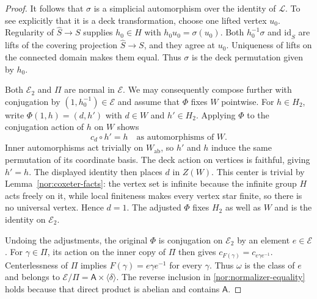 \begin{proof}
It follows that $\sigma$ is a simplicial automorphism over
the identity of $\mathcal L$.  To see explicitly that it is
a deck transformation, choose one lifted vertex $u_0$.
Regularity of $\widehat S\to S$ supplies $h_0\in H$ with
$h_0u_0=\sigma(u_0)$.  Both $h_0^{-1}\sigma$ and
$\mathrm{id}_{\widehat S}$ are lifts of the covering
projection $\widehat S\to S$, and they agree at $u_0$.
Uniqueness of lifts on the connected domain makes them equal.
Thus $\sigma$ is the deck permutation given by $h_0$.

Both $\mathcal E_2$ and $\Pi$ are normal in $\mathcal E$.
We may consequently compose further with conjugation by
$(1,h_0^{-1})\in\mathcal E$ and assume that $\Phi$ fixes
$W$ pointwise.  For $h\in H_2$, write
$\Phi(1,h)=(d,h')$ with $d\in W$ and $h'\in H_2$.
Applying $\Phi$ to the conjugation action of $h$ on $W$
shows
\[
 c_d\circ h'=h\quad\text{as automorphisms of }W.
\]
Inner automorphisms act trivially on $W_{\mathrm{ab}}$,
so $h'$ and $h$ induce the same permutation of its
coordinate basis.  The deck action on vertices is
faithful, giving $h'=h$.  The displayed identity then
places $d$ in $Z(W)$.  This center is trivial by
Lemma~\ref{nor:coxeter-facts}: the vertex set is infinite
because the infinite group $H$ acts freely on it, while
local finiteness makes every vertex star finite, so there
is no universal vertex.  Hence $d=1$.  The adjusted
$\Phi$ fixes $H_2$ as well as $W$ and is the identity on
$\mathcal E_2$.

Undoing the adjustments, the original $\Phi$ is
conjugation on $\mathcal E_2$ by an element $e\in\mathcal E$.
For $\gamma\in\Pi$, its action on the inner copy of $\Pi$
then gives
$c_{F(\gamma)}=c_{e\gamma e^{-1}}$.  Centerlessness of
$\Pi$ implies $F(\gamma)=e\gamma e^{-1}$ for every
$\gamma$.  Thus $\omega$ is the class of $e$ and belongs
to $\mathcal E/\Pi=\mathsf A\times\langle\delta\rangle$.
The reverse inclusion in \eqref{nor:normalizer-equality}
holds because that direct product is abelian and contains
$\mathsf A$.
\end{proof}

